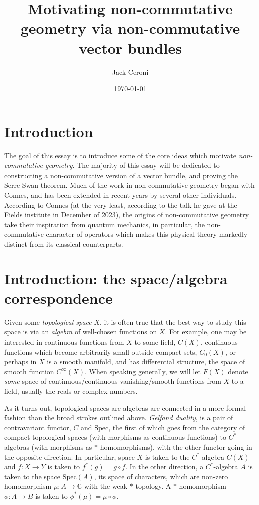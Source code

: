 \documentclass[aps,pra,showpacs,notitlepage,onecolumn,superscriptaddress,nofootinbib]{revtex4-1}
\theoremstyle{definition}
\begin{document}
\title{Motivating non-commutative geometry via non-commutative vector bundles}
\author{Jack Ceroni}

\date{\today}

\maketitle

\section{Introduction}

\noindent The goal of this essay is to introduce some of the core ideas which motivate \emph{non-commutative geometry}. The majority of this essay will be
dedicated to constructing a non-commutative version of a vector bundle, and proving the Serre-Swan theorem. Much of the work in non-commutative geometry began with Connes,
and has been extended in recent years by several other individuals. According to Connes (at the very least, according to the talk he gave at the Fields institute in December
of 2023), the origins of non-commutative geometry take their inspiration from quantum mechanics, in particular, the non-commutative character of operators which makes
this physical theory markedly distinct from its classical counterparts.

\section{Introduction: the space/algebra correspondence}

\noindent Given some \emph{topological space} $X$, it is often true that the best way to study this space is via an \emph{algebra} of well-chosen functions on $X$. For example, one may be interested
in continuous functions from $X$ to some field, $C(X)$, continuous functions which become arbitrarily small outside compact sets, $C_0(X)$, or perhaps in $X$ is a smooth manifold,
and has differential structure, the space of smooth function $C^{\infty}(X)$. When speaking generally, we will let $F(X)$ denote \emph{some} space of continuous/continuous vanishing/smooth
functions from $X$ to a field, usually
the reals or complex numbers.

As it turns out, topological spaces are algebras are connected in a more formal fashion than the broad strokes outlined above. \emph{Gelfand duality}, is a pair of contravariant functor, $C$ and $\text{Spec}$, the first of which
goes from the category of compact topological spaces (with morphisms as continuous functions) to $C^{*}$-algebras (with morphisms as $*$-homomorphisms), with the other functor going in the opposite direction.
In particular, space $X$ is taken to the $C^{*}$-algebra $C(X)$ and $f : X \rightarrow Y$ is taken to $f^{*}(g) = g \circ f$. In the other direction, a $C^{*}$-algebra $A$ is taken to the space $\text{Spec}(A)$,
its space of characters, which are non-zero homomorphism $\mu : A \rightarrow \mathbb{C}$ with the weak-$*$ topology. A $*$-homomorphism $\phi : A \rightarrow B$ is taken to $\phi^{*}(\mu) = \mu \circ \phi$.
\end{document}
